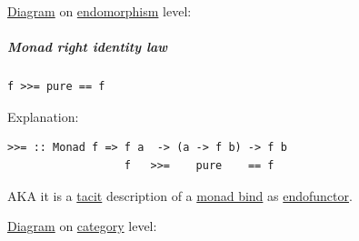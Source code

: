 \documentclass[a4paper,14pt,oneside]{book}
\begin{document}
\hyperref[org5a1f59b]{Diagram} on \hyperref[org8a1eefa]{endomorphism} level:


\subparagraph{\label{orga4a3756}Monad right identity law}
\label{sec:org81e6a0d}
\begin{verbatim}
f >>= pure == f
\end{verbatim}

Explanation:
\begin{verbatim}
>>= :: Monad f => f a  -> (a -> f b) -> f b
                  f   >>=    pure    == f
\end{verbatim}
AKA it is a \hyperref[org2f60f78]{tacit} description of a \hyperref[orgd26a670]{monad bind} as \hyperref[org74e7f20]{endofunctor}.

\hyperref[org5a1f59b]{Diagram} on \hyperref[org90c6a99]{category} level:
\end{document}
